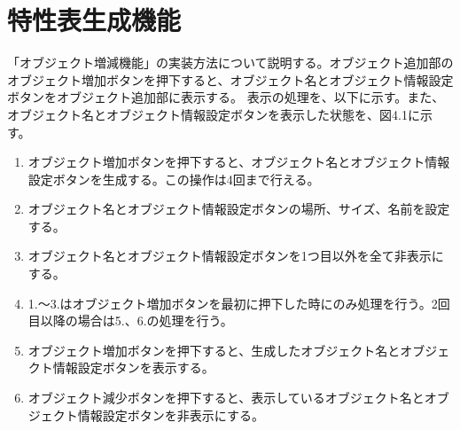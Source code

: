 
\section{特性表生成機能}\label{gazou_input}
「オブジェクト増減機能」の実装方法について説明する。オブジェクト追加部のオブジェクト増加ボタンを押下すると、オブジェクト名とオブジェクト情報設定ボタンをオブジェクト追加部に表示する。
表示の処理を、以下に示す。また、オブジェクト名とオブジェクト情報設定ボタンを表示した状態を、図4.1に示す。

\begin{enumerate}
  \item オブジェクト増加ボタンを押下すると、オブジェクト名とオブジェクト情報設定ボタンを生成する。この操作は4回まで行える。
  \item オブジェクト名とオブジェクト情報設定ボタンの場所、サイズ、名前を設定する。
  \item オブジェクト名とオブジェクト情報設定ボタンを1つ目以外を全て非表示にする。
  \item 1.〜3.はオブジェクト増加ボタンを最初に押下した時にのみ処理を行う。2回目以降の場合は5.、6.の処理を行う。
  \item オブジェクト増加ボタンを押下すると、生成したオブジェクト名とオブジェクト情報設定ボタンを表示する。
  \item オブジェクト減少ボタンを押下すると、表示しているオブジェクト名とオブジェクト情報設定ボタンを非表示にする。
\end{enumerate}

